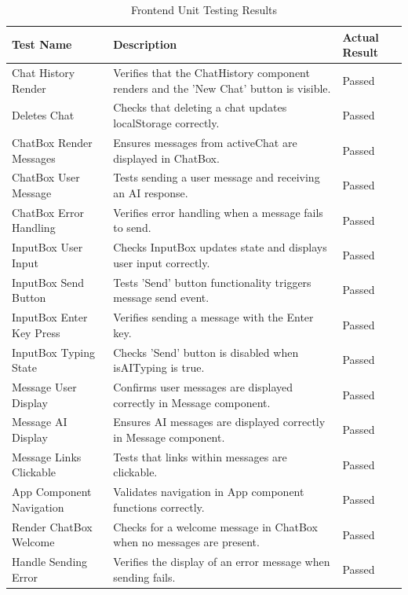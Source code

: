 \documentclass{l4proj}
\begin{document}
\begin{appendices}
\begin{table}[htbp]
\centering
\renewcommand{\arraystretch}{1.47} %
\begin{tabular}{
    |>{\centering\arraybackslash}m{3.5cm}
    |m{7.5cm}
    |>{\centering\arraybackslash}m{2.5cm}|}
\hline
\rowcolor{HeaderColor}Test Name & Description & Actual Result \\
\hline
\rowcolor{RowColor}Chat History Render & Verifies that the ChatHistory component renders and the 'New Chat' button is visible. & Passed \\
\hline
Deletes Chat & Checks that deleting a chat updates localStorage correctly. & Passed \\
\hline
\rowcolor{RowColor}ChatBox Render Messages & Ensures messages from activeChat are displayed in ChatBox. & Passed \\
\hline
ChatBox User Message & Tests sending a user message and receiving an AI response. & Passed \\
\hline
\rowcolor{RowColor}ChatBox Error Handling & Verifies error handling when a message fails to send. & Passed \\
\hline
InputBox User Input & Checks InputBox updates state and displays user input correctly. & Passed \\
\hline
\rowcolor{RowColor}InputBox Send Button & Tests 'Send' button functionality triggers message send event. & Passed \\
\hline
InputBox Enter Key Press & Verifies sending a message with the Enter key. & Passed \\
\hline
\rowcolor{RowColor}InputBox Typing State & Checks 'Send' button is disabled when isAITyping is true. & Passed \\
\hline
Message User Display & Confirms user messages are displayed correctly in Message component. & Passed \\
\hline
\rowcolor{RowColor}Message AI Display & Ensures AI messages are displayed correctly in Message component. & Passed \\
\hline
Message Links Clickable & Tests that links within messages are clickable. & Passed \\
\hline
\rowcolor{RowColor}App Component Navigation & Validates navigation in App component functions correctly. & Passed \\
\hline
Render ChatBox Welcome & Checks for a welcome message in ChatBox when no messages are present. & Passed \\
\hline
Handle Sending Error & Verifies the display of an error message when sending fails. & Passed \\
\hline
\end{tabular}
\caption{Frontend Unit Testing Results}
\end{table}


\end{appendices}
\end{document}
